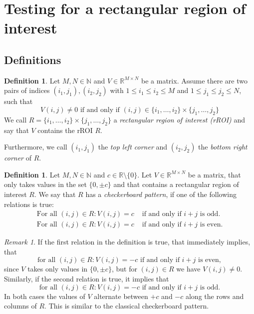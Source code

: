 \documentclass[a4paper,12pt]{article}
\theoremstyle{plain}
\theoremstyle{definition}
\newtheorem{definition}[theorem]{Definition}
\theoremstyle{remark}
\newtheorem{remark}[theorem]{Remark}
\begin{document}
\newpage

\section{Testing for a rectangular region of interest}

\subsection{Definitions}

\begin{definition}
	Let $M, N \in \mathbb{N}$ and $V \in \mathbb{R}^{M \times N}$ be a matrix. Assume there are two pairs of indices $(i_1, j_1), (i_2, j_2)$ with $1 \leq i_1 \leq i_2 \leq M$ and $1 \leq j_1 \leq j_2 \leq N$, such that
	\begin{equation}
		V(i, j) \neq 0 \textrm{ if and only if } (i, j) \in \{ i_1, \dots, i_2 \} \times \{ j_1, \dots, j_2 \}
	\end{equation}
	We call $R = \{ i_1, \dots, i_2 \} \times \{ j_1, \dots, j_2 \}$ a \emph{rectangular region of interest (rROI)} and say that $V$ contains the rROI $R$.
	
	Furthermore, we call $(i_1, j_1)$ the \emph{top left corner} and $(i_2, j_2)$ the \emph{bottom right corner} of $R$.
\end{definition}

\begin{definition}
	Let $M, N \in \mathbb{N}$ and $c \in \mathbb{R} \setminus \{ 0 \}$. Let $V \in \mathbb{R}^{M \times N}$ be a matrix, that only takes values in the set $\{ 0, \pm c \}$ and that contains a rectangular region of interest $R$. We say that $R$ has a \emph{checkerboard pattern}, if one of the following relations is true:
	\begin{subequations}
		\begin{align}
			\textrm{For all } (i, j) \in R: V(i, j) = c &\textrm{ if and only if } i + j \textrm{ is odd}.\\
			\textrm{For all } (i, j) \in R: V(i, j) = c &\textrm{ if and only if } i + j \textrm{ is even}.
		\end{align}
	\end{subequations}
\end{definition}

\begin{remark}
	If the first relation in the definition is true, that immediately implies, that
	\begin{equation*}
		\textrm{for all } (i, j) \in R: V(i, j) = - c \textrm{ if and only if } i + j \textrm{ is even},
	\end{equation*}
	since $V$ takes only values in $\{ 0, \pm c \}$, but for $(i, j) \in R$ we have $V(i,j) \neq 0$.
	Similarly, if the second relation is true, it implies that
	\begin{equation*}
		\textrm{for all } (i, j) \in R: V(i, j) = - c \textrm{ if and only if } i + j \textrm{ is odd}.
	\end{equation*}
	In both cases the values of $V$ alternate between $+c$ and $-c$ along the rows and columns of $R$. This is similar to the classical checkerboard pattern.
\end{remark}
\end{document}
